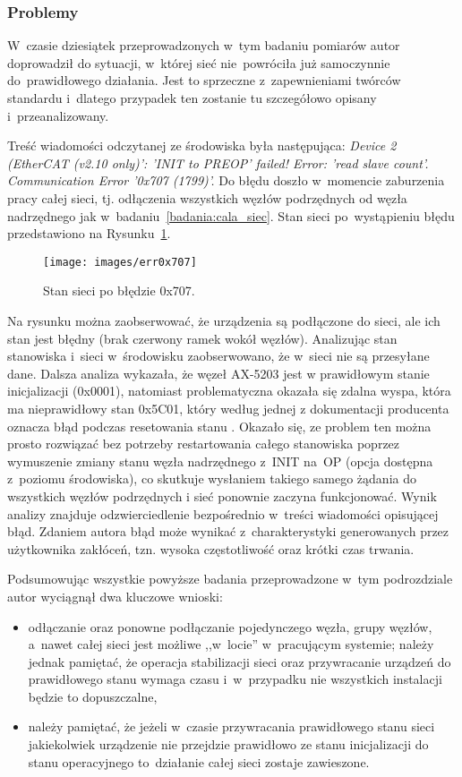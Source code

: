 \subsubsection{Problemy}
W~czasie dziesiątek przeprowadzonych w~tym badaniu pomiarów autor doprowadził do sytuacji, w~której sieć nie~powróciła już samoczynnie do~prawidłowego działania. Jest to sprzeczne z~zapewnieniami twórców standardu i~dlatego przypadek ten zostanie tu szczegółowo opisany i~przeanalizowany.

Treść wiadomości odczytanej ze środowiska była następująca: \textit{Device 2 (EtherCAT (v2.10 only)': 'INIT to PREOP' failed! Error: 'read slave count'. Communication Error '0x707 (1799)'.}
Do błędu doszło w~momencie zaburzenia pracy całej sieci, tj. odłączenia wszystkich węzłów podrzędnych od węzła nadrzędnego jak w~badaniu~\ref{badania:cala_siec}. Stan sieci po~wystąpieniu błędu przedstawiono na Rysunku~\ref{err0x707}.
\begin{figure}[!htb] 	\centering 	\texttt{[image: images/err0x707]} \caption{Stan sieci po błędzie 0x707.} \label{err0x707} \end{figure}

Na rysunku można zaobserwować, że urządzenia są podłączone do sieci, ale ich stan jest błędny (brak czerwony ramek wokół węzłów). Analizując stan stanowiska i~sieci w~środowisku zaobserwowano, że w~sieci nie są przesyłane dane.
Dalsza analiza wykazała, że węzeł AX-5203 jest w prawidłowym stanie inicjalizacji (0x0001), natomiast problematyczna okazała się zdalna wyspa, która ma nieprawidłowy stan 0x5C01, który według jednej z dokumentacji producenta oznacza błąd podczas resetowania stanu \cite{err0x707}.
Okazało się, ze problem ten można prosto rozwiązać bez potrzeby restartowania całego stanowiska poprzez wymuszenie zmiany stanu węzła nadrzędnego z~INIT na~OP (opcja dostępna z~poziomu środowiska), co skutkuje wysłaniem takiego samego żądania do wszystkich węzłów podrzędnych i sieć ponownie zaczyna funkcjonować. Wynik analizy znajduje odzwierciedlenie bezpośrednio w~treści wiadomości opisującej błąd. Zdaniem autora błąd może wynikać z~charakterystyki  generowanych przez użytkownika zakłóceń, tzn. wysoka częstotliwość oraz krótki czas trwania.

Podsumowując wszystkie powyższe badania przeprowadzone w~tym podrozdziale autor wyciągnął dwa kluczowe wnioski:
\begin{itemize}
\item odłączanie oraz ponowne podłączanie pojedynczego węzła, grupy węzłów, a~nawet całej sieci jest możliwe ,,w~locie'' w~pracującym systemie; należy jednak pamiętać, że operacja stabilizacji sieci oraz przywracanie urządzeń do prawidłowego stanu wymaga czasu i~w~przypadku nie wszystkich instalacji będzie to dopuszczalne,
\item należy pamiętać, że jeżeli w~czasie przywracania prawidłowego stanu sieci jakiekolwiek urządzenie nie przejdzie prawidłowo ze stanu inicjalizacji do stanu operacyjnego to~działanie całej sieci zostaje zawieszone.
\end{itemize}

